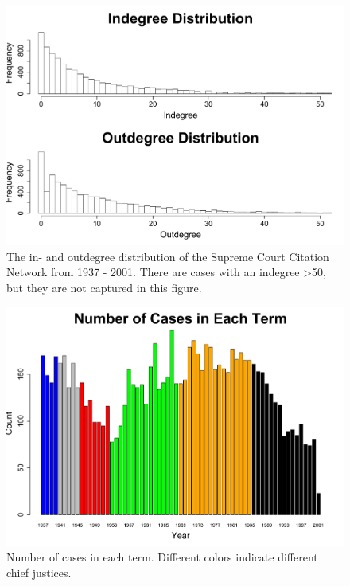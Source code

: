 \documentclass[headsepline=true, abstracton]{scrartcl}
\begin{document}
\begin{figure}[H]
\includegraphics[scale=0.5]{degree_distribution}
\caption{The in- and outdegree distribution of the Supreme Court Citation Network from 1937 - 2001. There are cases with an indegree >50, but they are not captured in this figure.}
 \label{degree_dist}
\vspace{-.25cm}
\end{figure}

\begin{figure}[H]
\includegraphics[scale=0.5]{number_cases}
\caption{Number of cases in each term. Different colors indicate different chief justices.}
 \label{number_cases}
\vspace{-.25cm}
\end{figure}  
  
\end{document}
